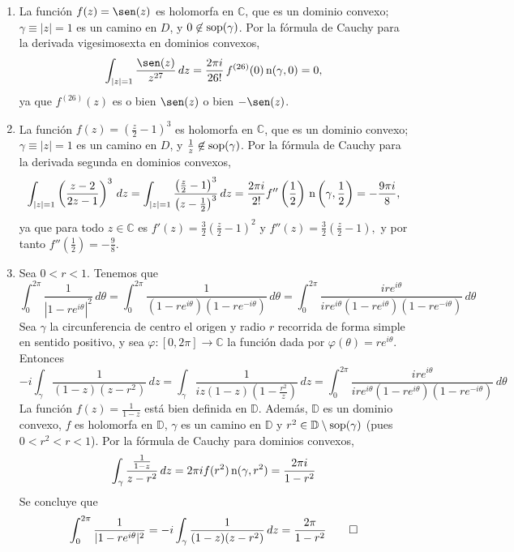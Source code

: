 \documentclass[11pt]{report}
\makeatletter
\renewenvironment{proof}[1][\proofname]{\par
  \pushQED{\qed}%
  \normalfont \topsep\z@skip %
  \trivlist
  \item[\hskip\labelsep
        \itshape
    #1\@addpunct{.}]\ignorespaces
}{%
  \popQED\endtrivlist\@endpefalse
}
\newcommand{\C}{\mathbb C}
\newcommand{\D}{\mathbb D}
\makeatother
\begin{document}
\begin{proof}
\hfill
\begin{enumerate}
    \item La función $f(z) = \sen(z)$ es holomorfa en $\C$, que es un dominio convexo; $\gamma \equiv |z| = 1$ es un camino en $D$, y $0 \not\in \textup{sop}(\gamma)$. Por la fórmula de Cauchy para la derivada vigesimosexta en dominios convexos,
    \[\int_{|z|=1} \frac{\sen(z)}{z^{27}} \, dz = \frac{2\pi i}{26!} \, f^{(26)}(0) \, \textup{n}(\gamma,0) = 0,\]
    ya que $f^{(26)}(z)$ es o bien $\sen(z)$ o bien $-\sen(z)$.
    \item La función $f(z) = (\frac{z}{2}-1)^3$ es holomorfa en $\C$, que es un dominio convexo; $\gamma \equiv |z| = 1$ es un camino en $D$, y $\frac{1}{z} \not\in \textup{sop}(\gamma)$. Por la fórmula de Cauchy para la derivada segunda en dominios convexos,
    \[\int_{|z|=1} \left(\frac{z-2}{2z-1}\right)^3 \, dz = \int_{|z|=1}\frac{\left(\frac{z}{2}-1\right)^3}{\left(z-\frac{1}{2}\right)^3}\, dz = \frac{2\pi i}{2!}f''\left(\frac{1}{2}\right)\, \textup{n}\left(\gamma,\frac{1}{2}\right) = -\frac{9\pi i}{8},\]
    ya que para todo $z \in \C$ es $f'(z) = \frac{3}{2}\left(\frac{z}{2}-1\right)^2$ y $f''(z) =\frac{3}{2}\left(\frac{z}{2}-1\right),$ y por tanto $f''(\frac{1}{2}) = -\frac{9}{8}$.
    \item Sea $0<r<1$. Tenemos que
    \[\int_0^{2\pi} \frac{1}{|1-re^{i\theta}|^2} \, d\theta = \int_0^{2\pi} \frac{1}{(1-re^{i\theta})(1-re^{-i\theta})} \, d\theta = \int_0^{2\pi} \frac{ire^{i\theta}}{ire^{i\theta}(1-re^{i\theta})(1-re^{-i\theta})} \, d\theta\]
    Sea $\gamma$ la circunferencia de centro el origen y radio $r$ recorrida de forma simple en sentido positivo, y sea $\varphi \colon [0,2\pi] \to \C$ la función dada por $\varphi(\theta) = re^{i\theta}$. Entonces
    \[-i\int_{\gamma}\frac{1}{(1-z)(z-r^2)} \, dz=\int_{\gamma}\frac{1}{iz(1-z)(1-\frac{r^2}{z})} \, dz = \int_0^{2\pi}\frac{ire^{i\theta}}{ire^{i\theta}(1-re^{i\theta})(1-re^{-i\theta})} \, d\theta\]
    La función $f(z) = \frac{1}{1-z}$ está bien definida en $\D$. Además, $\D$ es un dominio convexo, $f$ es holomorfa en $\D$, $\gamma$ es un camino en $\D$ y $r^2 \in \D \setminus \textup{sop}(\gamma)$ (pues $0<r^2<r<1$). Por la fórmula de Cauchy para dominios convexos,
    \[\int_\gamma \frac{\frac{1}{1-z}}{z-r^2} \, dz = 2\pi i f(r^2) \, \textup{n}(\gamma, r^2) = \frac{2\pi i}{1-r^2}\]
    Se concluye que
    \[\int_0^{2\pi} \frac{1}{|1-re^{i\theta}|^2}=-i\int_{\gamma}\frac{1}{(1-z)(z-r^2)} \, dz=\frac{2\pi}{1-r^2} \qedhere\]
\end{enumerate}
\end{proof}
\end{document}
